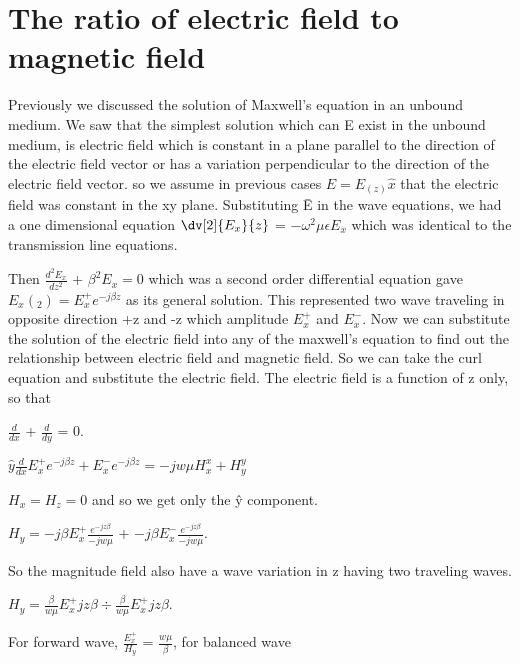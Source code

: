 \chapter{The ratio of electric field to magnetic field}\label{lec:lec22}
Previously we discussed the solution of  Maxwell's equation in an unbound medium. We saw that the simplest solution which can E exist in the unbound medium, is electric field which is constant in a plane parallel to the direction of the electric field vector or has a variation perpendicular to the direction of the electric field vector. so we assume in previous cases $\hat{E}=E_(z)\hat{x}$ that the electric field was constant in the xy plane. Substituting \={E} in the wave equations, we had a one dimensional equation $\dv[2]{E_x}{z}$ = $-\omega^2\mu\epsilon E_x$ which was identical to the transmission line equations. 

Then $\frac{d^2E_x}{dz^2}$ + $\beta^2 E_x = 0$ which was a second order differential equation gave $E_x(_{2}) = E_x^{+}e^{-j\beta z}$ as its general solution. This represented two wave traveling in opposite direction +z and -z which amplitude $E_x^{+}$ and $E_x^{-}$. Now we can substitute the solution of the electric field into any of the maxwell's equation to find out the relationship between electric field and magnetic field. So we can take the curl equation and substitute the electric field. The electric field is a function of z only, so that

$\frac{d}{dx}$ + $\frac{d}{dy}$ = 0.

$\hat{y} \frac{d}{dx} E_x^{+} e^{-j \beta z} + E_x^{-} e^{-j\beta z} = -jw \mu H_x^{x} + H_y^
{y}$

$H_x = H_z = 0$ and so we get only the \^{y} component.

$H_y = -j\beta E_x^{+}\frac{e^{-jz\beta}}{-jw\mu}$ + $-j \beta E_x^{-}\frac{e^{-jz\beta}}{-jw\mu}$.

So the magnitude field also have a wave variation in z having two traveling waves. 

$H_y = \frac{\beta}{w\mu}E_x^{+}jz\beta \div \frac{\beta}{w\mu}E_x^{+}jz\beta$.

For forward wave, $\frac{E_x^+}{H_y}$ = $\frac{w\mu}{\beta}$, for balanced wave 

